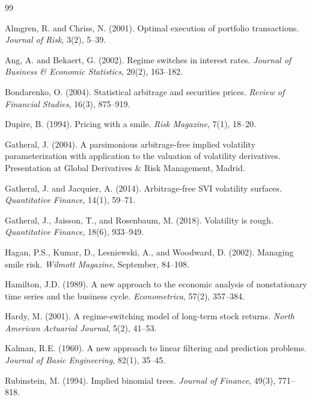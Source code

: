 \documentclass[12pt, letterpaper]{article}
\begin{document}

\begin{thebibliography}{99}

Almgren, R. and Chriss, N. (2001).
\newblock Optimal execution of portfolio transactions.
\newblock \emph{Journal of Risk}, 3(2), 5--39.

Ang, A. and Bekaert, G. (2002).
\newblock Regime switches in interest rates.
\newblock \emph{Journal of Business \& Economic Statistics}, 20(2), 163--182.

Bondarenko, O. (2004).
\newblock Statistical arbitrage and securities prices.
\newblock \emph{Review of Financial Studies}, 16(3), 875--919.

Dupire, B. (1994).
\newblock Pricing with a smile.
\newblock \emph{Risk Magazine}, 7(1), 18--20.

Gatheral, J. (2004).
\newblock A parsimonious arbitrage-free implied volatility parameterization with
application to the valuation of volatility derivatives.
\newblock Presentation at Global Derivatives \& Risk Management, Madrid.

Gatheral, J. and Jacquier, A. (2014).
\newblock Arbitrage-free {SVI} volatility surfaces.
\newblock \emph{Quantitative Finance}, 14(1), 59--71.

Gatheral, J., Jaisson, T., and Rosenbaum, M. (2018).
\newblock Volatility is rough.
\newblock \emph{Quantitative Finance}, 18(6), 933--949.

Hagan, P.S., Kumar, D., Lesniewski, A., and Woodward, D. (2002).
\newblock Managing smile risk.
\newblock \emph{Wilmott Magazine}, September, 84--108.

Hamilton, J.D. (1989).
\newblock A new approach to the economic analysis of nonstationary time series
and the business cycle.
\newblock \emph{Econometrica}, 57(2), 357--384.

Hardy, M. (2001).
\newblock A regime-switching model of long-term stock returns.
\newblock \emph{North American Actuarial Journal}, 5(2), 41--53.

Kalman, R.E. (1960).
\newblock A new approach to linear filtering and prediction problems.
\newblock \emph{Journal of Basic Engineering}, 82(1), 35--45.

Rubinstein, M. (1994).
\newblock Implied binomial trees.
\newblock \emph{Journal of Finance}, 49(3), 771--818.

\end{thebibliography}
\end{document}
